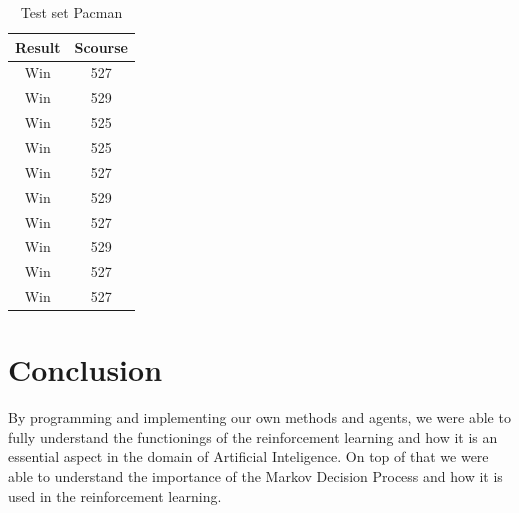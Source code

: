\documentclass{article}
\begin{document}
\begin{table}[!ht]
  \begin{center}
    \begin{tabular}{||c||c||}
      \hline
      Result & Scourse\\
      \hline\hline
      Win & 527 \\
      \hline\hline
      Win & 529 \\
      \hline
      Win & 525 \\
      \hline
      Win & 525 \\
      \hline
      Win & 527 \\
      \hline
      Win & 529 \\
      \hline
      Win & 527 \\
      \hline
      Win & 529 \\
      \hline
      Win & 527 \\
      \hline
      Win & 527 \\
      \hline
    \end{tabular}
    \caption{Test set Pacman}
    \label{tab:testPac}
  \end{center}
\end{table}

\pagebreak\pagebreak
\section{Conclusion}

By programming and implementing our own methods and agents, we were able to fully understand the functionings of the reinforcement learning and how it is an essential aspect in the domain of Artificial Inteligence.
On top of that we were able to understand the importance of the Markov Decision Process and how it is used in the reinforcement learning.
\end{document}

